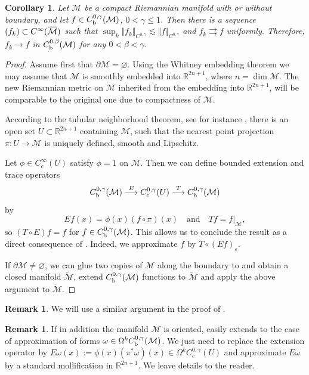 \documentclass[intlimits,12pt,reqno]{amsart}
\newcommand{\cM}{\mathcal M}
\newcommand{\bbbr}{\mathbb R}
\newcommand{\R}{\mathbb R}
\newcommand{\overbar}[1]{\mkern 1.7mu\overline{\mkern-1.7mu#1\mkern-1.5mu}\mkern 1.5mu}
\newcommand{\eps}{\varepsilon}
\numberwithin{equation}{section}
\newtheorem{corollary}[theorem]{Corollary}
\theoremstyle{definition}
\newtheorem{remark}[theorem]{Remark}
\begin{document}
\begin{corollary}
\label{T71}
Let $\cM$ be a compact Riemannian manifold with or without boundary, and let $f\in C_{\rm b}^{0,\gamma}(\cM)$, $0<\gamma\leq 1$. Then there is a sequence $(f_k)\subset C^\infty(\overbar{\cM})$ such that $\sup_k\Vert f_k\Vert_{C^{0,\gamma}}\lesssim\Vert f\Vert_{C^{0,\gamma}}$ and $f_k\rightrightarrows f$ uniformly. Therefore, $f_k\to f$ in $C_{\rm b}^{0,\beta}(\cM)$ for any \mbox{$0<\beta<\gamma$}.
\end{corollary}
\begin{proof}
Assume first that $\partial\cM=\varnothing$.
Using the Whitney embedding theorem we may assume that $\cM$ is smoothly embedded into $\R^{2n+1}$, where $n=\dim\cM$. The new Riemannian metric on $\cM$ inherited from the embedding into $\R^{2n+1}$, will be comparable to the original one due to compactness of $\cM$.

According to the tubular neighborhood theorem, see for instance \cite[.3]{Simon96}, there is an open set $U\subset\R^{2n+1}$ containing $\cM$, such that the nearest point projection $\pi:U\to\cM$ is uniquely defined, smooth and Lipschitz. 

Let $\phi\in C_c^\infty(U)$ satisfy $\phi=1$ on $\cM$. Then we can define bounded extension and trace operators
$$
C_{\rm b}^{0,\gamma}(\cM)\stackrel{E}{\longrightarrow} C_c^{0,\gamma}(U)\stackrel{T}{\longrightarrow}C_{\rm b}^{0,\gamma}(\cM)
$$
by
$$
Ef(x)=\phi(x)(f\circ\pi)(x)
\quad
\text{and}
\quad
Tf=f|_{\cM},
$$
so $(T\circ E)f=f$ for $f\in C_{\rm b}^{0,\gamma}(\cM)$.
This allows us to conclude the result as a direct consequence of .
Indeed, we approximate $f$ by $T\circ(Ef)_\eps$.

If $\partial\cM\neq\varnothing$, we can glue two copies of $\cM$ along the boundary to and obtain a closed manifold $\widetilde{\cM}$, extend $C_{\rm b}^{0,\gamma}(\cM)$ functions to $\widetilde{\cM}$ and apply the above argument to $\widetilde{\cM}$. 
\end{proof}
\begin{remark}
We will use a similar argument in the proof of . 
\end{remark}
\begin{remark}
\label{R8}
If in addition the manifold $\cM$ is oriented,
 easily extends to the case of approximation of forms $\omega\in\Omega^kC_{\rm b}^{0,\gamma}(\cM)$. We just need to replace the extension operator by 
$E\omega(x):=\phi(x)(\pi^*\omega)(x)\in\Omega^kC_c^{0,\gamma}(U)$ and approximate $E\omega$ by a standard mollification in $\bbbr^{2n+1}$. We leave details to the reader.
\end{remark}
\end{document}
